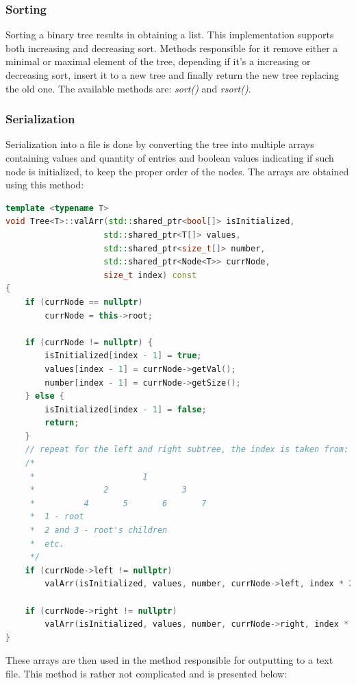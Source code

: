 \documentclass[12pt]{article}
\begin{document}
\subsubsection{Sorting}
Sorting a binary tree results in obtaining a list. This implementation supports both increasing and decreasing sort. Methods responsible for it remove either a minimal or maximal element of the tree, depending if it's a increasing or decreasing sort, insert it to a new tree and finally return the new tree replacing the old one. The available methods are: \textit{sort()} and \textit{rsort()}.

\pagebreak
\subsubsection{Serialization}
Serialization into a file is done by converting the tree into multiple arrays containing values and quantity of entries and boolean values indicating if such node is initialized, to keep the proper order of the nodes. The arrays are obtained using this method:
\begin{footnotesize}
\begin{lstlisting}[language=C++]
template <typename T>
void Tree<T>::valArr(std::shared_ptr<bool[]> isInitialized, 
                    std::shared_ptr<T[]> values, 
                    std::shared_ptr<size_t[]> number, 
                    std::shared_ptr<Node<T>> currNode, 
                    size_t index) const
{
    if (currNode == nullptr)
        currNode = this->root;

    if (currNode != nullptr) {                      
        isInitialized[index - 1] = true;
        values[index - 1] = currNode->getVal();
        number[index - 1] = currNode->getSize();
    } else {
        isInitialized[index - 1] = false;
        return;
    }
    // repeat for the left and right subtree, the index is taken from:
    /*
     *                      1
     *              2               3
     *          4       5       6       7
     *  1 - root
     *  2 and 3 - root's children
     *  etc.
     */
    if (currNode->left != nullptr)
        valArr(isInitialized, values, number, currNode->left, index * 2);

    if (currNode->right != nullptr)
        valArr(isInitialized, values, number, currNode->right, index * 2 + 1);
}
\end{lstlisting}
\end{footnotesize}

\pagebreak
These arrays are then used in the method responsible for outputting to a text file. This method is rather not complicated and is presented below:
\end{document}
